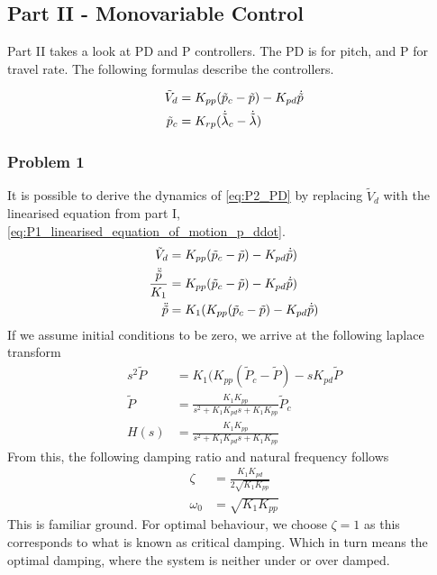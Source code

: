\subsection{Part II - Monovariable Control}\label{subsec:part2}
Part II takes a look at PD and P controllers. The PD is for pitch, and P for travel rate. The following formulas describe the controllers.

\begin{align}
        \tilde{V}_d &= K_{pp} (\tilde{p}_c - \tilde{p}) - K_{pd}\dot{\tilde{p}}  \label{eq:P2_PD}\\  
        \tilde{p}_c &= K_{rp} (\dot{\tilde{\lambda}}_c - \dot{\tilde{\lambda}}) \label{eq:P2_P}
\end{align}

\subsubsection{Problem 1}
It is possible to derive the dynamics of \cref{eq:P2_PD} by replacing $\tilde{V}_d$ with the linearised equation from part I, \cref{eq:P1_linearised_equation_of_motion_p_ddot}.
\begin{align*}
    \tilde{V}_d &= K_{pp} (\tilde{p}_c - \tilde{p}) - K_{pd}\dot{\tilde{p}}) \\
    \frac{\ddot{\tilde{p}}}{K_1} &= K_{pp} (\tilde{p}_c - \tilde{p}) - K_{pd}\dot{\tilde{p}}) \\
    \ddot{\tilde{p}} &= K_1(K_{pp}(\tilde{p}_c - \tilde{p}) - K_{pd} \dot{\tilde{p}})
\end{align*}
If we assume initial conditions to be zero, we arrive at the following laplace transform
\begin{align}
    s^2\tilde{P} &= K_1(K_{pp}(\tilde{P}_c - \tilde{P}) - sK_{pd} \tilde{P}  \nonumber \\
    \tilde{P} &= \frac{K_1 K_{pp}}{s^2 + K_1 K_{pd} s + K_1 K_{pp}} \tilde{P}_c \nonumber \\
    H(s) &= \frac{K_1 K_{pp}}{s^2 + K_1 K_{pd} s + K_1 K_{pp}}
\end{align}
From this, the following damping ratio and natural frequency follows
\begin{align}
    \zeta &= \frac{K_1 K_{pd}}{2\sqrt{K_1 K_{pp}}} \label{eq:P2_damping_ratio} \\
    \omega_0 &= \sqrt{K_1 K_{pp}} \label{eq:P2_natural_frequency}
\end{align}
This is familiar ground. For optimal behaviour, we choose $\zeta = 1$ as this corresponds to what is known as critical damping. Which in turn means the optimal damping, where the system is neither under or over damped.\\
